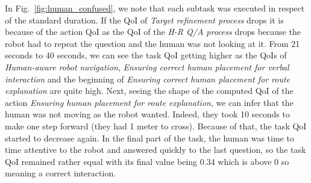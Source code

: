 \documentclass[a4paper,11pt,twoside]{StyleThese}
\begin{document}
In Fig.~\ref{fig:human_confused}, we note that each subtask was executed in respect of the standard duration. If the QoI of \emph{Target refinement process} drops it is because of the action QoI as the QoI of the \emph{H-R Q/A process} drops because the robot had to repeat the question and the human was not looking at it. From 21 seconds to 40 seconds, we can see the task QoI getting higher as the QoIs of \emph{Human-aware robot navigation}, \emph{Ensuring correct human placement for verbal interaction} and the beginning of \emph{Ensuring correct human placement for route explanation} are quite high. Next, seeing the shape of the computed QoI of the action \emph{Ensuring human placement for route explanation}, we can infer that the human was not moving as the robot wanted. Indeed, they took 10 seconds to make one step forward (they had 1 meter to cross). Because of that, the task QoI started to decrease again. In the final part of the task, the human was time to time attentive to the robot and answered quickly to the last question, so the task QoI remained rather equal with its final value being $0.34$ which is above 0 so meaning a correct interaction.
\end{document}
